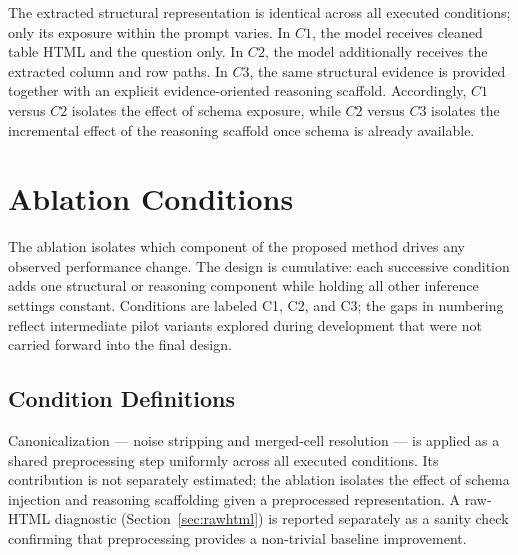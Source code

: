 ﻿\documentclass[a4paper]{article}
\begin{document}
The extracted structural representation is identical across all executed conditions; only its exposure within the prompt varies. In \(C1\), the model receives cleaned table HTML and the question only. In \(C2\), the model additionally receives the extracted column and row paths. In \(C3\), the same structural evidence is provided together with an explicit evidence-oriented reasoning scaffold. Accordingly, \(C1\) versus \(C2\) isolates the effect of schema exposure, while \(C2\) versus \(C3\) isolates the incremental effect of the reasoning scaffold once schema is already available.

\section{Ablation Conditions}

The ablation isolates which component of the proposed method drives 
any observed performance change. The design is cumulative: each 
successive condition adds one structural or reasoning component while 
holding all other inference settings constant. Conditions are labeled 
C1, C2, and C3; the gaps in numbering reflect intermediate pilot 
variants explored during development that were not carried forward 
into the final design.

\subsection{Condition Definitions}

Canonicalization --- noise stripping and merged-cell resolution --- 
is applied as a shared preprocessing step uniformly across all 
executed conditions. Its contribution is not separately estimated; 
the ablation isolates the effect of schema injection and reasoning 
scaffolding given a preprocessed representation. A raw-HTML 
diagnostic (Section~\ref{sec:rawhtml}) is reported separately as a 
sanity check confirming that preprocessing provides a non-trivial 
baseline improvement.
\end{document}
